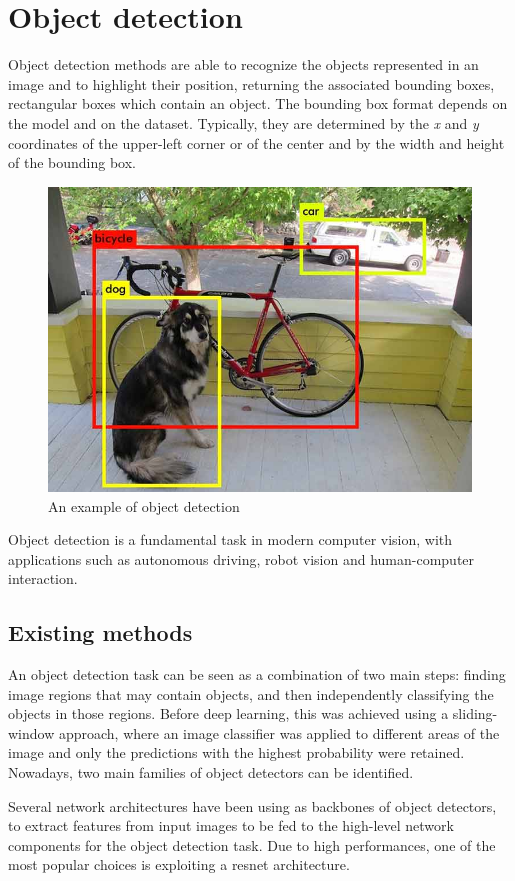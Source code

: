 \documentclass[%
    corpo=12pt,
    twoside,
    stile=classica,   
    tipotesi=magistrale,
    evenboxes,
    english,
	numerazioneromana,
]{toptesi}
\begin{document}
\section{Object detection}\label{sec:detection}
Object detection methods are able to recognize the objects represented in an image and to highlight their position, returning the associated bounding boxes, rectangular boxes which contain an object. The bounding box format depends on the model and on the dataset. Typically, they are determined by the \textit{x} and \textit{y} coordinates of the upper-left corner
or of the center
and by the width and height of the bounding box.

\begin{figure}[ht]
	\centering
	\includegraphics[width=.65\textwidth]{imgs/yolo_detection.png}
	\caption{An example of object detection\cite{redmon2016look}}
\end{figure}

Object detection is a fundamental task in modern computer vision, with applications such as autonomous driving, robot vision and human-computer interaction.

\subsection{Existing methods}\label{sec:detectors}
An object detection task can be seen as a combination of two main steps: finding image regions that may contain objects, and then independently classifying the objects in those regions. Before deep learning, this was achieved using a sliding-window approach, where an image classifier was applied to different areas of the image and only the predictions with the highest probability were retained. Nowadays, two main families of object detectors can be identified.

\bigskip
Several network architectures have been using as backbones of object detectors, to extract features from input images to be fed to the high-level network components for the object detection task. Due to high performances, one of the most popular choices is exploiting a \gls{resnet} architecture\cite{he2015deep}.
\end{document}
